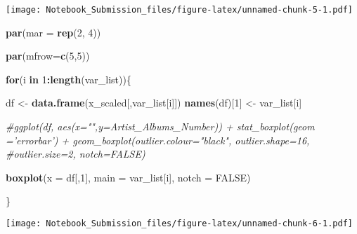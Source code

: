 \documentclass[
]{article}
\newenvironment{Shaded}{\begin{snugshade}}{\end{snugshade}}
\newcommand{\CommentTok}[1]{\textcolor[rgb]{0.56,0.35,0.01}{\textit{#1}}}
\newcommand{\ControlFlowTok}[1]{\textcolor[rgb]{0.13,0.29,0.53}{\textbf{#1}}}
\newcommand{\DataTypeTok}[1]{\textcolor[rgb]{0.13,0.29,0.53}{#1}}
\newcommand{\DecValTok}[1]{\textcolor[rgb]{0.00,0.00,0.81}{#1}}
\newcommand{\KeywordTok}[1]{\textcolor[rgb]{0.13,0.29,0.53}{\textbf{#1}}}
\newcommand{\NormalTok}[1]{#1}
\newcommand{\OperatorTok}[1]{\textcolor[rgb]{0.81,0.36,0.00}{\textbf{#1}}}
\newcommand{\OtherTok}[1]{\textcolor[rgb]{0.56,0.35,0.01}{#1}}
\newcommand{\StringTok}[1]{\textcolor[rgb]{0.31,0.60,0.02}{#1}}
\begin{document}
\texttt{[image: Notebook\_Submission\_files/figure-latex/unnamed-chunk-5-1.pdf]}

\begin{Shaded}
\begin{Highlighting}[]
\KeywordTok{par}\NormalTok{(}\DataTypeTok{mar =} \KeywordTok{rep}\NormalTok{(}\DecValTok{2}\NormalTok{, }\DecValTok{4}\NormalTok{))}

\KeywordTok{par}\NormalTok{(}\DataTypeTok{mfrow=}\KeywordTok{c}\NormalTok{(}\DecValTok{5}\NormalTok{,}\DecValTok{5}\NormalTok{))}

\ControlFlowTok{for}\NormalTok{(i }\ControlFlowTok{in} \DecValTok{1}\OperatorTok{:}\KeywordTok{length}\NormalTok{(var_list))\{}
  
\NormalTok{  df <-}\StringTok{ }\KeywordTok{data.frame}\NormalTok{(x_scaled[,var_list[i]])}
  \KeywordTok{names}\NormalTok{(df)[}\DecValTok{1}\NormalTok{] <-}\StringTok{ }\NormalTok{var_list[i]}
  
  \CommentTok{#ggplot(df, aes(x="",y=Artist_Albums_Number)) + stat_boxplot(geom ='errorbar') + geom_boxplot(outlier.colour="black", outlier.shape=16, #outlier.size=2, notch=FALSE)}
  
  \KeywordTok{boxplot}\NormalTok{(}\DataTypeTok{x =}\NormalTok{ df[,}\DecValTok{1}\NormalTok{], }\DataTypeTok{main =}\NormalTok{ var_list[i], }\DataTypeTok{notch =} \OtherTok{FALSE}\NormalTok{)}

\NormalTok{\}}
\end{Highlighting}
\end{Shaded}

\texttt{[image: Notebook\_Submission\_files/figure-latex/unnamed-chunk-6-1.pdf]}
\end{document}
